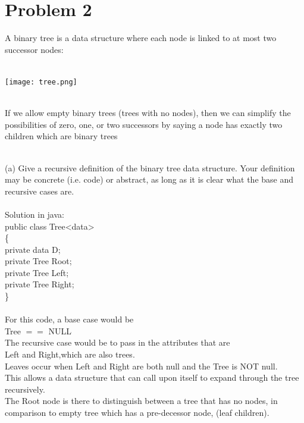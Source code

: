 \documentclass{article}
\newcommand*\moveToRight[1]{\hspace*{0em plus 1fill}\makebox{(#1)}}
\newcommand*\fixindent{ \hspace{1pt}\\}
\begin{document}
\newpage
\section{Problem 2}
A binary tree is a data structure where each node is linked to at most two successor nodes:\\\\
\begin{centering}\texttt{[image: tree.png]}
\end{centering}

\fixindent{}
If we allow empty binary trees (trees with no nodes), then we can simplify the possibilities of zero, one, or two successors by saying a node has exactly two children which are binary trees

\fixindent{}
(a) Give a recursive definition of the binary tree data structure. Your definition may be concrete (i.e. code)
or abstract, as long as it is clear what the base and recursive cases are. \moveToRight{4 marks}\\\\Solution in java:\\
\hspace*{150pt}public class Tree\textless  data\textgreater\\
\hspace*{150pt}\{\\
\hspace*{165pt} private data D;\\
\hspace*{165pt} private Tree Root;\\
\hspace*{165pt} private Tree Left;\\
\hspace*{165pt} private Tree Right;\\
\hspace*{150pt}\}\\\\
For this code, a base case would be \\
Tree $==$ NULL\\
The recursive case would be to pass in the attributes that are\\
Left and Right,which are also trees.\\
Leaves occur when Left and Right are both null and the Tree is NOT null.\\
This allows a data structure that can call upon itself to expand through the tree recursively.\\
The Root node is there to distinguish between a tree that has no nodes, in comparison to empty tree which has a pre-decessor node, (leaf children).\\\\\\
\end{document}
